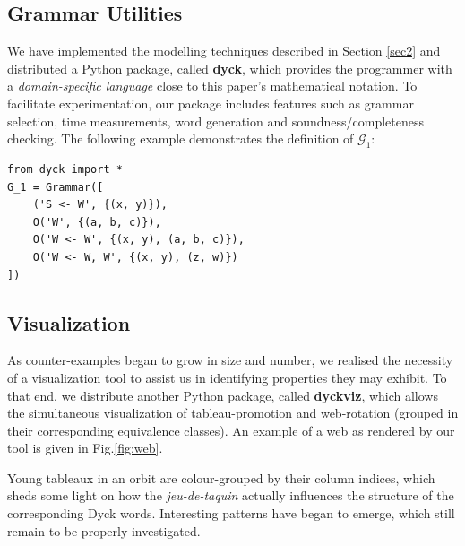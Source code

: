 \documentclass[nonatbib,numbers,10pt]{llncs}
\begin{document}
\subsection{Grammar Utilities}
We have implemented the modelling techniques described in Section \ref{sec2} and distributed a Python package, called \textbf{dyck}, which provides the programmer with a \textit{domain-specific language} close to this paper's mathematical notation. To facilitate experimentation, our package includes features such as grammar selection, time measurements, word generation and soundness/completeness checking. The following example demonstrates the definition of $\mathcal{G}_1$:

\begin{center}
\begin{minipage}{0.5\textwidth}
\begin{verbatim}
from dyck import *
G_1 = Grammar([
    ('S <- W', {(x, y)}),
    O('W', {(a, b, c)}),
    O('W <- W', {(x, y), (a, b, c)}),
    O('W <- W, W', {(x, y), (z, w)}) 
])
\end{verbatim}
\end{minipage}
\end{center}

\subsection{Visualization}
As counter-examples began to grow in size and number, we realised the necessity of a visualization tool to assist us in identifying properties they may exhibit. To that end, we distribute another Python package, called \textbf{dyckviz}, which allows the simultaneous visualization of tableau-promotion and web-rotation (grouped in their corresponding equivalence classes). An example of a web as rendered by our tool is given in Fig.\ref{fig:web}.

Young tableaux in an orbit are colour-grouped by their column indices, which sheds some light on how the \textit{jeu-de-taquin} actually influences the structure of the corresponding Dyck words. Interesting patterns have began to emerge, which still remain to be properly investigated. 
\end{document}

